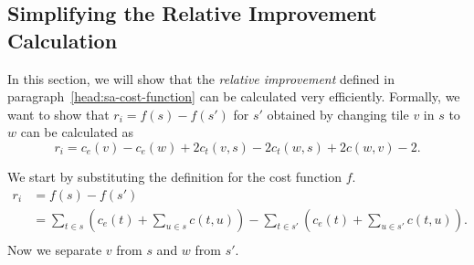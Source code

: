 \subsection{Simplifying the Relative Improvement Calculation}\label{sec:analysis-proof-improvement}

In this section, we will show that the \emph{relative improvement} defined in paragraph~\ref{head:sa-cost-function} can be calculated very efficiently.
Formally, we want to show that $r_i = f(s) - f(s')$ for $s'$ obtained by changing tile $v$ in $s$ to $w$ can be calculated as
\begin{equation*}
    r_i = c_e(v) - c_e(w)  + 2 c_t(v,s) - 2 c_t(w,s) + 2c(w,v) - 2.
\end{equation*}

We start by substituting the definition for the cost function $f$.
\begin{align*}
    r_i & = f(s) - f(s')                                                                                                                 \\
        & = \sum_{t \in s} \left(c_e(t) + \sum_{u \in s} c(t,u) \right) - \sum_{t \in s'} \left(c_e(t) + \sum_{u \in s'} c(t,u) \right). \\
\end{align*}
Now we separate $v$ from $s$ and $w$ from $s'$.
